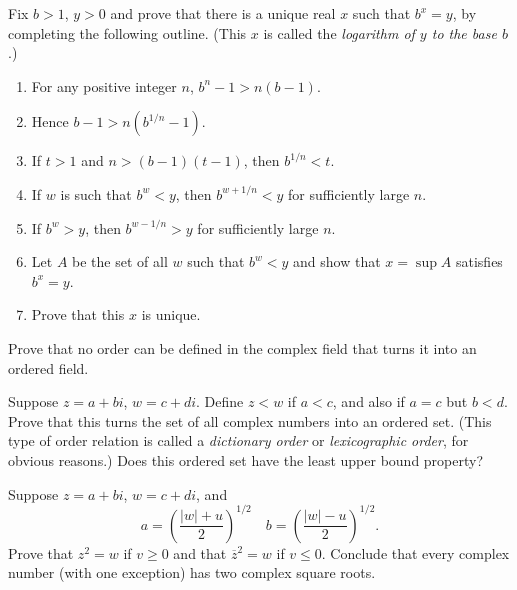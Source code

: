 \documentclass[12 pt, letterpaper]{hmcpset}
\begin{document}
\begin{problem}[7.]
	Fix $b > 1$, $y > 0$ and prove that there is a unique real $x$ such that $b^{x} = y$, by completing the following outline. (This $x$ is called the \textit{logarithm of $y$ to the base $b$}.)
	\begin{enumerate}
		\item For any positive integer $n$, $b^{n} - 1 > n(b - 1)$.
		\item Hence $b - 1 > n(b^{1/n} - 1)$.
		\item If $t > 1$ and $n > (b - 1)(t - 1)$, then $b^{1/n} < t$.
		\item If $w$ is such that $b^{w} < y$, then $b^{w + 1/n} < y$ for sufficiently large $n$.
		\item If $b^{w} > y$, then $b^{w - 1/n} > y$ for sufficiently large $n$.
		\item Let $A$ be the set of all $w$ such that $b^{w} < y$ and show that $x = \sup A$ satisfies $b^{x} = y$.
		\item Prove that this $x$ is unique.
	\end{enumerate}
\end{problem}

\pagebreak

\begin{problem}[8.]
	Prove that no order can be defined in the complex field that turns it into an ordered field.
\end{problem}

\pagebreak

\begin{problem}[9.]
	Suppose $z = a + bi$, $w = c + di$. Define $z < w$ if $a < c$, and also if $a = c$ but $b < d$. Prove that this turns the set of all complex numbers into an ordered set. (This type of order relation is called a \textit{dictionary order} or \textit{lexicographic order}, for obvious reasons.) Does this ordered set have the least upper bound property?
\end{problem}

\pagebreak

\begin{problem}[10.]
	Suppose $z = a + bi$, $w = c + di$, and
	\[
		a = \left ( \frac{\lvert w \rvert + u}{2} \right )^{1/2} \quad b = \left ( \frac{\lvert w \rvert - u}{2} \right )^{1/2}.
	\]
	Prove that $z^{2} = w$ if $v \ge 0$ and that $\overline{z}^{2} = w$ if $v \le 0$. Conclude that every complex number (with one exception) has two complex square roots.
\end{problem}
\end{document}
